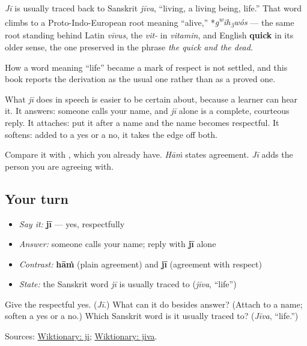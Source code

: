 \begin{cousinweb}
\emph{Jī} is usually traced back to Sanskrit \emph{jīva}, \textquotedblleft{}living, a living being, life.\textquotedblright{} That word climbs to a Proto-Indo-European root meaning \textquotedblleft{}alive,\textquotedblright{} *\emph{g\textsuperscript{w}ih\textsubscript{3}wós} — the same root standing behind Latin \emph{vīvus}, the \emph{vit-} in \emph{vitamin}, and English \textbf{quick} in its older sense, the one preserved in the phrase \emph{the quick and the dead}.

How a word meaning \textquotedblleft{}life\textquotedblright{} became a mark of respect is not settled, and this book reports the derivation as the usual one rather than as a proved one.

What \emph{jī} does in speech is easier to be certain about, because a learner can hear it. It answers: someone calls your name, and \emph{jī} alone is a complete, courteous reply. It attaches: put it after a name and the name becomes respectful. It softens: added to a yes or a no, it takes the edge off both.

Compare it with \textbf{}, which you already have. \emph{Hāṁ} states agreement. \emph{Jī} adds the person you are agreeing with.
\end{cousinweb}

\subsection*{Your turn}
\begin{itemize}
\raggedright
  \item \emph{Say it:} \textbf{jī} — yes, respectfully
  \item \emph{Answer:} someone calls your name; reply with \textbf{jī} alone
  \item \emph{Contrast:} \textbf{hāṁ} (plain agreement) and \textbf{jī} (agreement with respect)
  \item \emph{State:} the Sanskrit word \emph{jī} is usually traced to (\emph{jīva}, \textquotedblleft{}life\textquotedblright{})
\end{itemize}

\begin{tcolorbox}[breakable,colback=teal!4,colframe=teal!35!black,title={Before you move on}]
Give the respectful yes. (\emph{Jī}.) What can it do besides answer? (Attach to a name; soften a yes or a no.) Which Sanskrit word is it usually traced to? (\emph{Jīva}, \textquotedblleft{}life.\textquotedblright{})

Sources: \href{https://en.wiktionary.org/wiki/\%E0\%A8\%9C\%E0\%A9\%80}{Wiktionary: ji}; \href{https://en.wiktionary.org/wiki/\%E0\%A4\%9C\%E0\%A5\%80\%E0\%A4\%B5}{Wiktionary: jiva}.
\end{tcolorbox}
